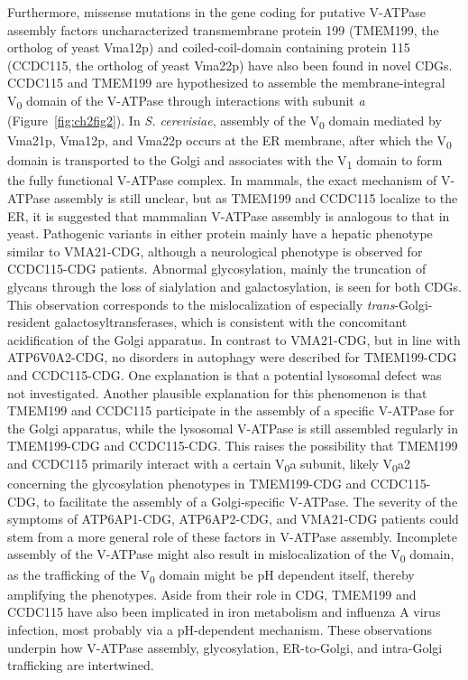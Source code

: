 Furthermore, missense mutations in the gene coding for putative V-ATPase assembly factors uncharacterized transmembrane protein 199 (TMEM199, the ortholog of yeast Vma12p) and coiled-coil-domain containing protein 115 (CCDC115, the ortholog of yeast Vma22p) have also been found in novel CDGs\cite{jansen_ccdc115_2016,jansen_tmem199_2016}. CCDC115 and TMEM199 are hypothesized to assemble the membrane-integral V\textsubscript{0} domain of the V-ATPase through interactions with subunit \emph{a} (Figure~\ref{fig:ch2fig2})\cite{graham_structure_2003}. In \emph{S. cerevisiae}, assembly of the V\textsubscript{0} domain mediated by Vma21p, Vma12p, and Vma22p occurs at the ER membrane\cite{graham_assembly_1998,hill_vma22p_1995,jackson_vma12_1997}, after which the V\textsubscript{0} domain is transported to the Golgi and associates with the V\textsubscript{1} domain to form the fully functional V-ATPase complex\cite{forgac_vacuolar_2007}. In mammals, the exact mechanism of V-ATPase assembly is still unclear, but as TMEM199 and CCDC115 localize to the ER, it is suggested that mammalian V-ATPase assembly is analogous to that in yeast\cite{miles_vacuolar-atpase_2017}. Pathogenic variants in either protein mainly have a hepatic phenotype similar to VMA21-CDG, although a neurological phenotype is observed for CCDC115-CDG patients. Abnormal glycosylation, mainly the truncation of glycans through the loss of sialylation and galactosylation, is seen for both CDGs. This observation corresponds to the mislocalization of especially \emph{trans}-Golgi-resident galactosyltransferases, which is consistent with the concomitant acidification of the Golgi apparatus. In contrast to VMA21-CDG\cite{cannata_serio_mutations_2020}, but in line with ATP6V0A2-CDG\cite{kornak_impaired_2008}, no disorders in autophagy were described for TMEM199-CDG and CCDC115-CDG\cite{jansen_ccdc115_2016,jansen_tmem199_2016}. One explanation is that a potential lysosomal defect was not investigated. Another plausible explanation for this phenomenon is that TMEM199 and CCDC115 participate in the assembly of a specific V-ATPase for the Golgi apparatus, while the lysosomal V-ATPase is still assembled regularly in TMEM199-CDG and CCDC115-CDG. This raises the possibility that TMEM199 and CCDC115 primarily interact with a certain V\textsubscript{0}a subunit, likely V\textsubscript{0}a2 concerning the glycosylation phenotypes in TMEM199-CDG and CCDC115-CDG, to facilitate the assembly of a Golgi-specific V-ATPase\cite{nishi_molecular_2000,schulz_differential_2007,toyomura_three_2000}. The severity of the symptoms of ATP6AP1-CDG, ATP6AP2-CDG, and VMA21-CDG patients could stem from a more general role of these factors in V-ATPase assembly. Incomplete assembly of the V-ATPase might also result in mislocalization of the V\textsubscript{0} domain, as the trafficking of the V\textsubscript{0} domain might be pH dependent itself, thereby amplifying the phenotypes. Aside from their role in CDG, TMEM199 and CCDC115 have also been implicated in iron metabolism\cite{miles_vacuolar-atpase_2017} and influenza A virus infection, most probably via a pH-dependent mechanism\cite{li_genome-wide_2020}. These observations underpin how V-ATPase assembly, glycosylation, ER-to-Golgi, and intra-Golgi trafficking are intertwined.

